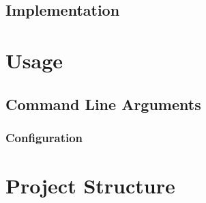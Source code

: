 \documentclass[12pt, letterpaper]{article}
\begin{document}
\subsection{Implementation}

\section{Usage}
\label{usage}

\subsection{Command Line Arguments}

\subsubsection{Configuration}


\newpage

\section{Project Structure}


\newpage

\printbibliography
\end{document}

